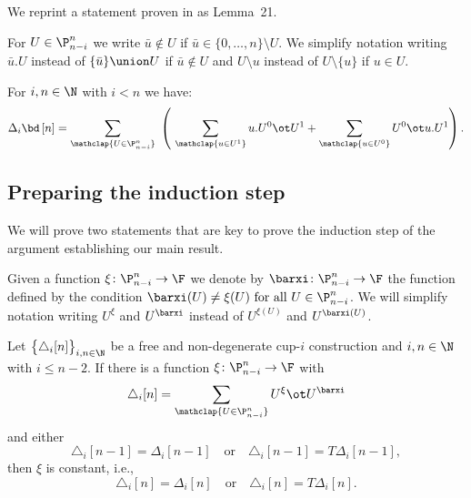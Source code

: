 We reprint a statement proven in \cite{medina2023fast_sq} as Lemma~21.

\begin{notation*}
	For $U \in \P_{n-i}^n$ we write $\bar u \notin U$ if $\bar u \in \{0, \dots, n\} \setminus U$.
	We simplify notation writing $\bar u.U$ instead of $\{\bar u\} \union U$ if $\bar u \notin U$ and $U \setminus u$ instead of $U \setminus \{u\}$ if $u \in U$.
\end{notation*}

\begin{proposition}\label{p:fact}
	For $i,n \in \N$ with $i < n$ we have:
	\[
	\Delta_i \bd \, [n] =
	\sum_{\mathclap{U \in \P_{n-i}^n}} \
	\left(\
	\sum_{\mathclap{u \in U^1}} u.U^0 \ot U^1 +
	\sum_{\mathclap{u \in U^0}} U^0 \ot u.U^1
	\right).
	\]
\end{proposition}

\subsection{Preparing the induction step}\label{ss:preparing}

We will prove two statements that are key to prove the induction step of the argument establishing our main result.

\begin{notation*}
	Given a function $\xi \colon \P_{n-i}^n \to \F$ we denote by $\barxi \colon \P_{n-i}^n \to \F$ the function defined by the condition $\barxi(U) \neq \xi(U) \text{ for all } U \in \P_{n-i}^n$.
	We will simplify notation writing $U^\xi$ and $U^{\barxi}$ instead of $U^{\xi(U)}$ and $U^{\barxi(U)}$.
\end{notation*}

\begin{lemma}\label{l:first nail}
	Let $\big\{ \triangle_i [n] \big\}_{i,n\in\N}$ be a free and non-degenerate \mbox{cup-$i$} construction and $i,n \in \N$ with $i \leq n-2$.
	If there is a function $\xi \colon \P_{n-i}^n \to \F$ with
	\begin{equation}\label{e:xi and barxi}
	\triangle_i [n] =
	\sum_{\mathclap{U \in \P_{n-i}^n}} U^{\xi} \ot U^{\barxi}
	\end{equation}
	and either
	\[
	\triangle_i [n-1] = \Delta_i [n-1]
	\quad \text{or} \quad
	\triangle_i [n-1] = T\Delta_i [n-1],
	\]
	then $\xi$ is constant, i.e.,
	\[
	\triangle_i [n] = \Delta_i [n]
	\quad \text{or} \quad
	\triangle_i [n] = T \Delta_i [n].
	\]
\end{lemma}

